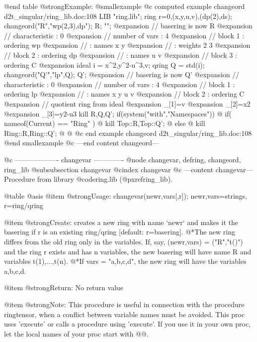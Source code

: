 @end table
@strong{Example:}
@smallexample
@c computed example changeord d2t_singular/ring_lib.doc:108 
LIB "ring.lib";
ring r=0,(x,y,u,v),(dp(2),ds);
changeord("R","wp(2,3),dp"); R; "";
@expansion{} // basering is now R
@expansion{} //   characteristic : 0
@expansion{} //   number of vars : 4
@expansion{} //        block   1 : ordering wp
@expansion{} //                  : names    x y 
@expansion{} //                  : weights  2 3 
@expansion{} //        block   2 : ordering dp
@expansion{} //                  : names    u v 
@expansion{} //        block   3 : ordering C
@expansion{} 
ideal i = x^2,y^2-u^3,v;
qring Q = std(i);
changeord("Q'","lp",Q); Q';
@expansion{} // basering is now Q'
@expansion{} //   characteristic : 0
@expansion{} //   number of vars : 4
@expansion{} //        block   1 : ordering lp
@expansion{} //                  : names    x y u v 
@expansion{} //        block   2 : ordering C
@expansion{} // quotient ring from ideal
@expansion{} _[1]=v
@expansion{} _[2]=x2
@expansion{} _[3]=y2-u3
kill R,Q,Q';
if(system("with","Namespaces")) @{
if( nameof(Current) == "Ring" ) @{
kill Top::R,Top::Q';
@} else @{
kill Ring::R,Ring::Q';
@}
@}
@c end example changeord d2t_singular/ring_lib.doc:108
@end smallexample
@c ---end content changeord---

@c ------------------- changevar -------------
@node changevar, defring, changeord, ring_lib
@subsubsection changevar
@cindex changevar
@c ---content changevar---
Procedure from library @code{ring.lib} (@pxref{ring_lib}).

@table @asis
@item @strong{Usage:}
changevar(newr,vars[,r]); newr,vars=strings, r=ring/qring

@item @strong{Create:}
creates a new ring with name `newr` and makes it the basering if r
is an existing ring/qring [default: r=basering].
@*The new ring differs from the old ring only in the variables. If,
say, (newr,vars) = ("R","t()") and the ring r exists and has n
variables, the new basering will have name R and variables
t(1),...,t(n).
@*If vars = "a,b,c,d", the new ring will have the variables a,b,c,d.

@item @strong{Return:}
No return value

@item @strong{Note:}
This procedure is useful in connection with the procedure ringtensor,
when a conflict between variable names must be avoided.
This proc uses 'execute' or calls a procedure using 'execute'.
If you use it in your own proc, let the local names of your proc
start with @@.

